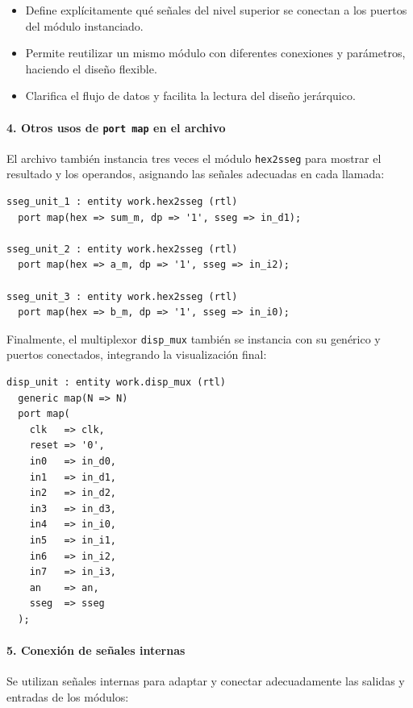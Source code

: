 \documentclass[a4paper,12pt]{article}
\begin{document}
\begin{itemize}
  \item Define explícitamente qué señales del nivel superior se conectan a los puertos del módulo instanciado.  
  \item Permite reutilizar un mismo módulo con diferentes conexiones y parámetros, haciendo el diseño flexible.  
  \item Clarifica el flujo de datos y facilita la lectura del diseño jerárquico.  
\end{itemize}

\paragraph{4. Otros usos de \texttt{port map} en el archivo}

El archivo también instancia tres veces el módulo \texttt{hex2sseg} para mostrar el resultado y los operandos, asignando las señales adecuadas en cada llamada:

\begin{lstlisting}[basicstyle=\ttfamily\footnotesize]
sseg_unit_1 : entity work.hex2sseg (rtl)
  port map(hex => sum_m, dp => '1', sseg => in_d1);

sseg_unit_2 : entity work.hex2sseg (rtl)
  port map(hex => a_m, dp => '1', sseg => in_i2);

sseg_unit_3 : entity work.hex2sseg (rtl)
  port map(hex => b_m, dp => '1', sseg => in_i0);
\end{lstlisting}

Finalmente, el multiplexor \texttt{disp\_mux} también se instancia con su genérico y puertos conectados, integrando la visualización final:

\begin{lstlisting}[basicstyle=\ttfamily\footnotesize]
disp_unit : entity work.disp_mux (rtl)
  generic map(N => N)
  port map(
    clk   => clk,
    reset => '0',
    in0   => in_d0,
    in1   => in_d1,
    in2   => in_d2,
    in3   => in_d3,
    in4   => in_i0,
    in5   => in_i1,
    in6   => in_i2,
    in7   => in_i3,
    an    => an,
    sseg  => sseg
  );
\end{lstlisting}

\paragraph{5. Conexión de señales internas}

Se utilizan señales internas para adaptar y conectar adecuadamente las salidas y entradas de los módulos:
\end{document}
